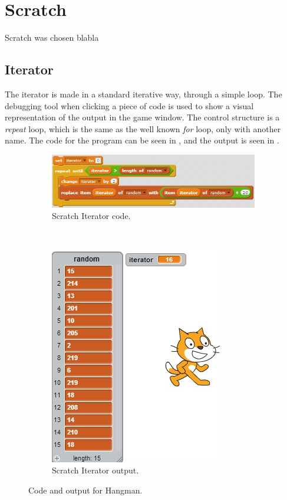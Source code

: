 \section{Scratch}
\label{sec:scratch}

Scratch was chosen blabla 

\subsection{Iterator}
The iterator is made in a standard iterative way, through a simple loop. The debugging tool when clicking a piece of code is used to show a visual representation of the output in the game window. The control structure is a \emph{repeat} loop, which is the same as the well known \emph{for} loop, only with another name. The code for the program can be seen in , and the output is seen in .

\begin{figure}[h]
  \centering
    \begin{subfigure}[b]{0.45\textwidth}
    \begin{center}
      \includegraphics[scale=0.5]{./pics/scratch_iter_code}
      \caption{Scratch Iterator code.}
      \label{fig:scratch_iter_code}
    \end{center}
    \end{subfigure}
    ~
    \begin{subfigure}[b]{0.45\textwidth}
    \begin{center}
      \includegraphics[scale=0.5]{./pics/scratch_iter_out}
      \caption{Scratch Iterator output.}
      \label{fig:scratch_iter_out}
    \end{center}
    \end{subfigure}
    \caption{Code and output for Hangman.}
    \label{fig:scratch_iter}
\end{figure}

